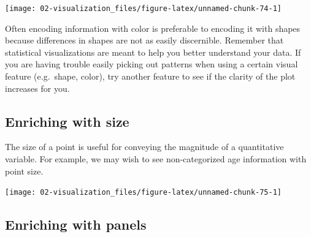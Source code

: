\documentclass[
]{book}
\newenvironment{Shaded}{\begin{snugshade}}{\end{snugshade}}
\newcommand{\CommentTok}[1]{\textcolor[rgb]{0.56,0.35,0.01}{\textit{#1}}}
\newcommand{\DataTypeTok}[1]{\textcolor[rgb]{0.13,0.29,0.53}{#1}}
\newcommand{\FloatTok}[1]{\textcolor[rgb]{0.00,0.00,0.81}{#1}}
\newcommand{\KeywordTok}[1]{\textcolor[rgb]{0.13,0.29,0.53}{\textbf{#1}}}
\newcommand{\NormalTok}[1]{#1}
\newcommand{\OperatorTok}[1]{\textcolor[rgb]{0.81,0.36,0.00}{\textbf{#1}}}
\newcommand{\StringTok}[1]{\textcolor[rgb]{0.31,0.60,0.02}{#1}}
\begin{document}
\begin{center}\texttt{[image: 02-visualization\_files/figure-latex/unnamed-chunk-74-1]} \end{center}

Often encoding information with color is preferable to encoding it with shapes because differences in shapes are not as easily discernible. Remember that statistical visualizations are meant to help you better understand your data. If you are having trouble easily picking out patterns when using a certain visual feature (e.g.~shape, color), try another feature to see if the clarity of the plot increases for you.

\hypertarget{enriching-with-size}{%
\subsection{Enriching with size}\label{enriching-with-size}}

The size of a point is useful for conveying the magnitude of a quantitative variable. For example, we may wish to see non-categorized age information with point size.

\begin{Shaded}
\end{Shaded}

\begin{center}\texttt{[image: 02-visualization\_files/figure-latex/unnamed-chunk-75-1]} \end{center}

\hypertarget{enriching-with-panels}{%
\subsection{Enriching with panels}\label{enriching-with-panels}}
\end{document}
